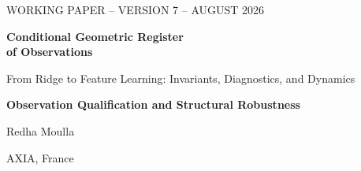 
\hypersetup{pageanchor=false}

\thispagestyle{empty}
\vspace*{1.25cm}
{\sffamily\color{teal}\fontsize{11.5}{14}\selectfont WORKING PAPER -- VERSION 7 -- AUGUST 2026\par}
\vspace{0.95cm}
{\sffamily\bfseries\color{black!88}\fontsize{24.5}{29}\selectfont Conditional Geometric Register\\of Observations\par}
\vspace{0.28cm}
{\sffamily\color{slate}\fontsize{16.2}{19}\selectfont From Ridge to Feature Learning: Invariants, Diagnostics, and Dynamics\par}
\vspace{0.22cm}
{\sffamily\bfseries\color{teal}\fontsize{11.2}{14}\selectfont Observation Qualification and Structural Robustness\par}
\vspace{0.68cm}
{\sffamily\fontsize{12}{14}\selectfont Redha Moulla\par}
{\sffamily\small\color{slate} AXIA, France\par}
\vspace{0.60cm}

